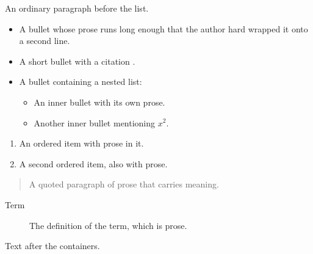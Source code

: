\documentclass{article}
\begin{document}
An ordinary paragraph before the list.

\begin{itemize}
\item A bullet whose prose runs long enough that the author hard wrapped
  it onto a second line.
\item A short bullet with a citation \cite{smith2020}.
\item A bullet containing a nested list:
  \begin{itemize}
  \item An inner bullet with its own prose.
  \item Another inner bullet mentioning $x^2$.
  \end{itemize}
\end{itemize}

\begin{enumerate}
\item An ordered item with prose in it.
\item A second ordered item, also with prose.
\end{enumerate}

\begin{quote}
A quoted paragraph of prose that carries meaning.
\end{quote}

\begin{description}
\item[Term] The definition of the term, which is prose.
\end{description}

Text after the containers.
\end{document}
